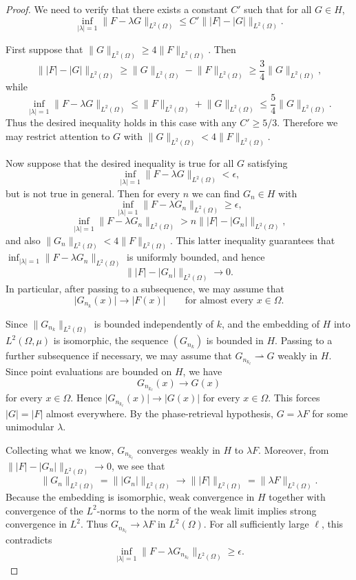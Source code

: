 \documentclass[11pt]{amsart}
\theoremstyle{definition}
\theoremstyle{remark}
\newcommand{\abs}[1]{\lvert #1 \rvert}
\newcommand{\norm}[1]{\lVert #1 \rVert}
\begin{document}
\begin{proof}
We need to verify that there exists a constant \(C'\) such that for all
\(G\in H\),
\[
\inf_{\abs{\lambda}=1}\norm{F-\lambda G}_{L^2(\Omega)}
\le
C'\norm{\abs F-\abs G}_{L^2(\Omega)}.
\]

First suppose that \(\norm{G}_{L^2(\Omega)}\ge4\norm F_{L^2(\Omega)}\).
Then
\[
\norm{\abs F-\abs G}_{L^2(\Omega)}
\ge
\norm G_{L^2(\Omega)}-\norm F_{L^2(\Omega)}
\ge
\frac34\norm G_{L^2(\Omega)},
\]
while
\[
\inf_{\abs{\lambda}=1}\norm{F-\lambda G}_{L^2(\Omega)}
\le
\norm F_{L^2(\Omega)}+\norm G_{L^2(\Omega)}
\le
\frac54\norm G_{L^2(\Omega)}.
\]
Thus the desired inequality holds in this case with any \(C'\ge5/3\).
Therefore we may restrict attention to \(G\) with
\(\norm G_{L^2(\Omega)}<4\norm F_{L^2(\Omega)}\).

Now suppose that the desired inequality is true for all \(G\) satisfying
\[
\inf_{\abs{\lambda}=1}\norm{F-\lambda G}_{L^2(\Omega)}<\epsilon,
\]
but is not true in general. Then for every \(n\) we can find \(G_n\in H\)
with
\[
\inf_{\abs{\lambda}=1}\norm{F-\lambda G_n}_{L^2(\Omega)}\ge\epsilon,
\]
\[
\inf_{\abs{\lambda}=1}\norm{F-\lambda G_n}_{L^2(\Omega)}
>
n\norm{\abs F-\abs{G_n}}_{L^2(\Omega)},
\]
and also \(\norm{G_n}_{L^2(\Omega)}<4\norm F_{L^2(\Omega)}\). This latter
inequality guarantees that
\(\inf_{\abs{\lambda}=1}\norm{F-\lambda G_n}_{L^2(\Omega)}\) is uniformly
bounded, and hence
\[
\norm{\abs F-\abs{G_n}}_{L^2(\Omega)}\to0.
\]
In particular, after passing to a subsequence, we may assume that
\[
\abs{G_{n_k}(x)}\to\abs{F(x)}
\qquad\text{for almost every }x\in\Omega.
\]

Since \(\norm{G_{n_k}}_{L^2(\Omega)}\) is bounded independently of \(k\), and
the embedding of \(H\) into \(L^2(\Omega,\mu)\) is isomorphic, the sequence
\((G_{n_k})\) is bounded in \(H\). Passing to a further subsequence if
necessary, we may assume that \(G_{n_{k_\ell}}\rightharpoonup G\) weakly in
\(H\). Since point evaluations are bounded on \(H\), we have
\[
G_{n_{k_\ell}}(x)\to G(x)
\]
for every \(x\in\Omega\). Hence \(\abs{G_{n_{k_\ell}}(x)}\to\abs{G(x)}\) for
every \(x\in\Omega\). This forces \(\abs G=\abs F\) almost everywhere. By the
phase-retrieval hypothesis, \(G=\lambda F\) for some unimodular \(\lambda\).

Collecting what we know, \(G_{n_{k_\ell}}\) converges weakly in \(H\) to
\(\lambda F\). Moreover, from
\(\norm{\abs F-\abs{G_n}}_{L^2(\Omega)}\to0\), we see that
\[
\norm{G_n}_{L^2(\Omega)}=\norm{\abs{G_n}}_{L^2(\Omega)}
\to
\norm{\abs F}_{L^2(\Omega)}
=\norm{\lambda F}_{L^2(\Omega)}.
\]
Because the embedding is isomorphic, weak convergence in \(H\) together with
convergence of the \(L^2\)-norms to the norm of the weak limit implies strong
convergence in \(L^2\). Thus \(G_{n_{k_\ell}}\to\lambda F\) in
\(L^2(\Omega)\). For all sufficiently large \(\ell\), this contradicts
\[
\inf_{\abs{\lambda}=1}
\norm{F-\lambda G_{n_{k_\ell}}}_{L^2(\Omega)}
\ge \epsilon.
\]
\end{proof}
\end{document}
